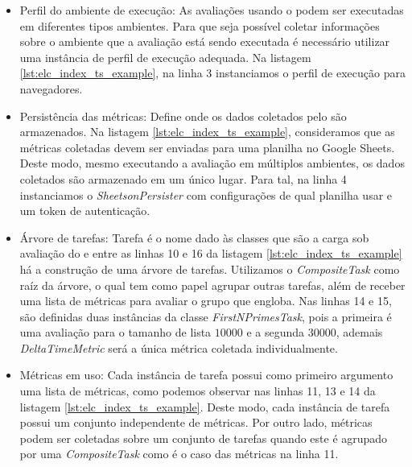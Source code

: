 \documentclass[12pt]{tcc}
\begin{document}
	\begin{itemize}
		\item Perfil do ambiente de execução: As avaliações usando o  podem ser executadas em diferentes tipos ambientes.
		Para que seja possível coletar informações sobre o ambiente que a avaliação está sendo executada é necessário utilizar uma instância de perfil de execução adequada.
		Na listagem \ref{lst:elc_index_ts_example}, na linha 3 instanciamos o perfil de execução para navegadores.

		\item Persistência das métricas: Define onde os dados coletados pelo  são armazenados.
		Na listagem \ref{lst:elc_index_ts_example}, consideramos que as métricas coletadas devem ser enviadas para uma planilha no Google Sheets.
		Deste modo, mesmo executando a avaliação em múltiplos ambientes, os dados coletados são armazenado em um único lugar.
		Para tal, na linha 4 instanciamos o \emph{SheetsonPersister} com configurações de qual planilha usar e um token de autenticação.

		\item Árvore de tarefas: Tarefa é o nome dado às classes que são a carga sob avaliação do  e entre as linhas 10 e 16 da listagem \ref{lst:elc_index_ts_example} há a construção de uma árvore de tarefas.
		Utilizamos o \emph{CompositeTask} como raíz da árvore, o qual tem como papel agrupar outras tarefas, além de receber uma lista de métricas para avaliar o grupo que engloba.
		Nas linhas 14 e 15, são definidas duas instâncias da classe \emph{FirstNPrimesTask}, pois a primeira é uma avaliação para o tamanho de lista $10000$ e a segunda $30000$, ademais \emph{DeltaTimeMetric} será a única métrica coletada individualmente.

		\item Métricas em uso: Cada instância de tarefa possui como primeiro argumento uma lista de métricas, como podemos observar nas linhas 11, 13 e 14 da listagem \ref{lst:elc_index_ts_example}.
		Deste modo, cada instância de tarefa possui um conjunto independente de métricas.
		Por outro lado, métricas podem ser coletadas sobre um conjunto de tarefas quando este é agrupado por uma \emph{CompositeTask} como é o caso das métricas na linha 11.
	\end{itemize}
\end{document}
